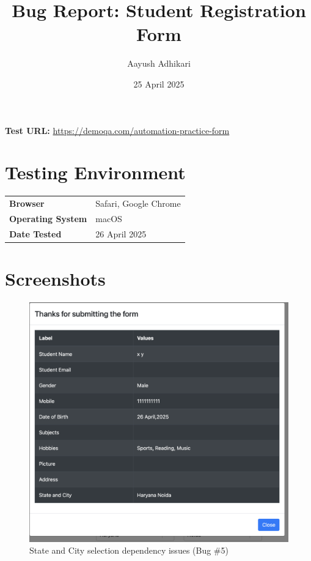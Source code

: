 \documentclass[12pt,a4paper]{article}
\title{Bug Report: Student Registration Form}
\author{Aayush Adhikari}
\date{25 April 2025}
\begin{document}
\maketitle
\thispagestyle{empty}

\begin{center}
    \large{\textbf{Test URL:} \url{https://demoqa.com/automation-practice-form}}
\end{center}

\vspace{1cm}

\tableofcontents
\newpage


\newpage


\newpage


\newpage


\newpage


\newpage

\section{Testing Environment}

\begin{tabular}{ll}
\toprule
\textbf{Browser} & Safari, Google Chrome \\
\textbf{Operating System} & macOS \\
\textbf{Date Tested} & 26 April 2025 \\
\bottomrule
\end{tabular}

\section{Screenshots}
\begin{figure}[h!]
    \centering
    \includegraphics[width=0.5\linewidth]{images/Screenshot 2025-04-26 at 00.34.49.png}
    \caption{State and City selection dependency issues (Bug \#5)}
    \label{fig:enter-label}
\end{figure}
\end{document}
